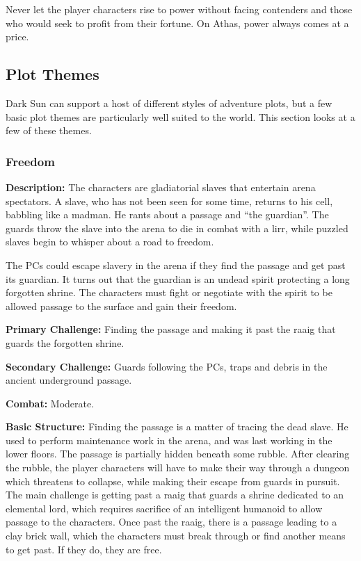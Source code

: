 Never let the player characters rise to power without facing contenders and those who would seek to profit from their fortune. On Athas, power always comes at a price.



\subsection{Plot Themes}
{\tableheader Dark Sun} can support a host of different styles of adventure plots, but a few basic plot themes are particularly well suited to the world. This section looks at a few of these themes.


\subsubsection{Freedom}

\textbf{Description:} The characters are gladiatorial slaves that entertain arena spectators. A slave, who has not been seen for some time, returns to his cell, babbling like a madman. He rants about a passage and ``the guardian''. The guards throw the slave into the arena to die in combat with a lirr, while puzzled slaves begin to whisper about a road to freedom.

The PCs could escape slavery in the arena if they find the passage and get past its guardian. It turns out that the guardian is an undead spirit protecting a long forgotten shrine. The characters must fight or negotiate with the spirit to be allowed passage to the surface and gain their freedom.

\textbf{Primary Challenge:} Finding the passage and making it past the raaig that guards the forgotten shrine.

\textbf{Secondary Challenge:} Guards following the PCs, traps and debris in the ancient underground passage.

\textbf{Combat:} Moderate.

\textbf{Basic Structure:} Finding the passage is a matter of tracing the dead slave. He used to perform maintenance work in the arena, and was last working in the lower floors. The passage is partially hidden beneath some rubble. After clearing the rubble, the player characters will have to make their way through a dungeon which threatens to collapse, while making their escape from guards in pursuit. The main challenge is getting past a raaig that guards a shrine dedicated to an elemental lord, which requires sacrifice of an intelligent humanoid to allow passage to the characters. Once past the raaig, there is a passage leading to a clay brick wall, which the characters must break through or find another means to get past. If they do, they are free.


